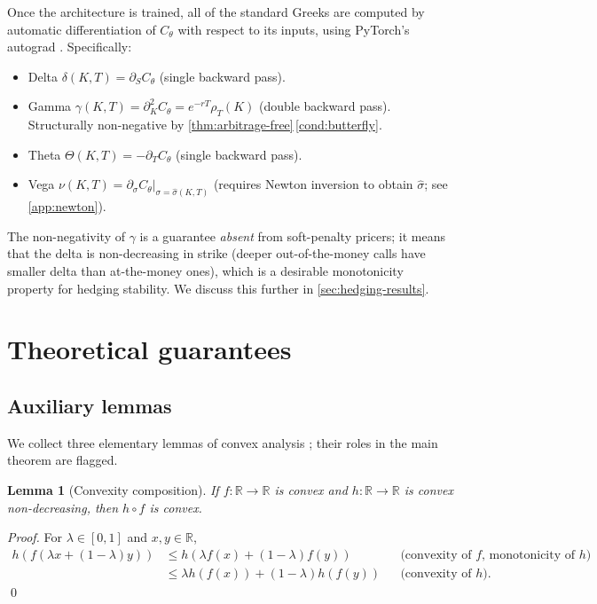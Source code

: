 \documentclass[largeformat]{interact}
\let\cite\citep   %
\theoremstyle{plain}
\newtheorem{lemma}[theorem]{Lemma}
\theoremstyle{definition}
\newcommand{\R}{\mathbb{R}}
\begin{document}
Once the architecture is trained, all of the standard Greeks are computed by automatic differentiation \cite{baydin2018autodiff} of $C_\theta$ with respect to its inputs, using PyTorch's autograd \cite{paszke2019pytorch}. Specifically:
\begin{itemize}[leftmargin=1.5em]
\item Delta $\delta(K, T) = \partial_S C_\theta$ (single backward pass).
\item Gamma $\gamma(K, T) = \partial^2_K C_\theta = e^{-rT}\rho_T(K)$ (double backward pass). Structurally non-negative by \cref{thm:arbitrage-free}\,\ref{cond:butterfly}.
\item Theta $\Theta(K, T) = -\partial_T C_\theta$ (single backward pass).
\item Vega $\nu(K, T) = \partial_\sigma C_\theta\big|_{\sigma = \widehat\sigma(K, T)}$ (requires Newton inversion to obtain $\widehat\sigma$; see \cref{app:newton}).
\end{itemize}
The non-negativity of $\gamma$ is a guarantee \emph{absent} from soft-penalty pricers; it means that the delta is non-decreasing in strike (deeper out-of-the-money calls have smaller delta than at-the-money ones), which is a desirable monotonicity property for hedging stability. We discuss this further in \cref{sec:hedging-results}.

\section{Theoretical guarantees}
\label{sec:theoretical-guarantees}

\subsection{Auxiliary lemmas}

We collect three elementary lemmas of convex analysis \cite{boyd2004convex}; their roles in the main theorem are flagged.

\begin{lemma}[Convexity composition]
\label{lem:cvx-comp}
If $f : \R \to \R$ is convex and $h : \R \to \R$ is convex non-decreasing, then $h \circ f$ is convex.
\end{lemma}
\begin{proof}
For $\lambda \in [0, 1]$ and $x, y \in \R$,
\begin{align*}
h(f(\lambda x + (1-\lambda) y)) &\leq h(\lambda f(x) + (1-\lambda) f(y)) && \text{(convexity of $f$, monotonicity of $h$)} \\
&\leq \lambda h(f(x)) + (1-\lambda) h(f(y)) && \text{(convexity of $h$)}.
\end{align*}
\qed
\end{proof}
\end{document}
